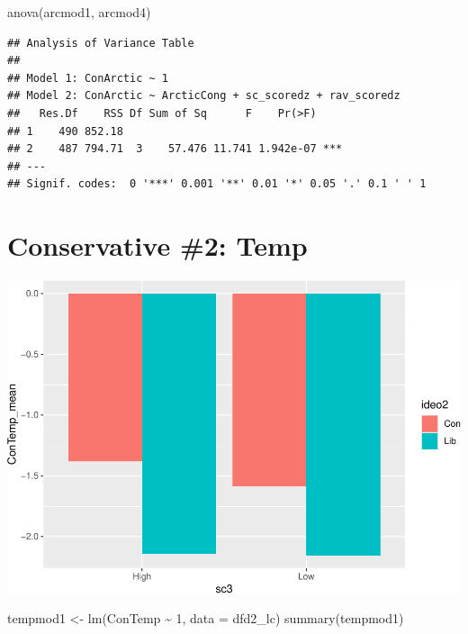\documentclass[
]{article}
\newenvironment{Shaded}{\begin{snugshade}}{\end{snugshade}}
\newcommand{\AttributeTok}[1]{\textcolor[rgb]{0.77,0.63,0.00}{#1}}
\newcommand{\DecValTok}[1]{\textcolor[rgb]{0.00,0.00,0.81}{#1}}
\newcommand{\FunctionTok}[1]{\textcolor[rgb]{0.00,0.00,0.00}{#1}}
\newcommand{\NormalTok}[1]{#1}
\newcommand{\OtherTok}[1]{\textcolor[rgb]{0.56,0.35,0.01}{#1}}
\newcommand{\SpecialCharTok}[1]{\textcolor[rgb]{0.00,0.00,0.00}{#1}}
\begin{document}
\begin{Shaded}
\begin{Highlighting}[]
\FunctionTok{anova}\NormalTok{(arcmod1, arcmod4)}
\end{Highlighting}
\end{Shaded}

\begin{verbatim}
## Analysis of Variance Table
## 
## Model 1: ConArctic ~ 1
## Model 2: ConArctic ~ ArcticCong + sc_scoredz + rav_scoredz
##   Res.Df    RSS Df Sum of Sq      F    Pr(>F)    
## 1    490 852.18                                  
## 2    487 794.71  3    57.476 11.741 1.942e-07 ***
## ---
## Signif. codes:  0 '***' 0.001 '**' 0.01 '*' 0.05 '.' 0.1 ' ' 1
\end{verbatim}

\hypertarget{conservative-2-temp}{%
\section{Conservative \#2: Temp}\label{conservative-2-temp}}

\includegraphics{desc0829_files/figure-latex/unnamed-chunk-3-1.pdf}

\begin{Shaded}
\begin{Highlighting}[]
\NormalTok{tempmod1 }\OtherTok{\textless{}{-}} \FunctionTok{lm}\NormalTok{(ConTemp }\SpecialCharTok{\textasciitilde{}} \DecValTok{1}\NormalTok{, }\AttributeTok{data =}\NormalTok{ dfd2\_lc)}
\FunctionTok{summary}\NormalTok{(tempmod1)}
\end{Highlighting}
\end{Shaded}
\end{document}
